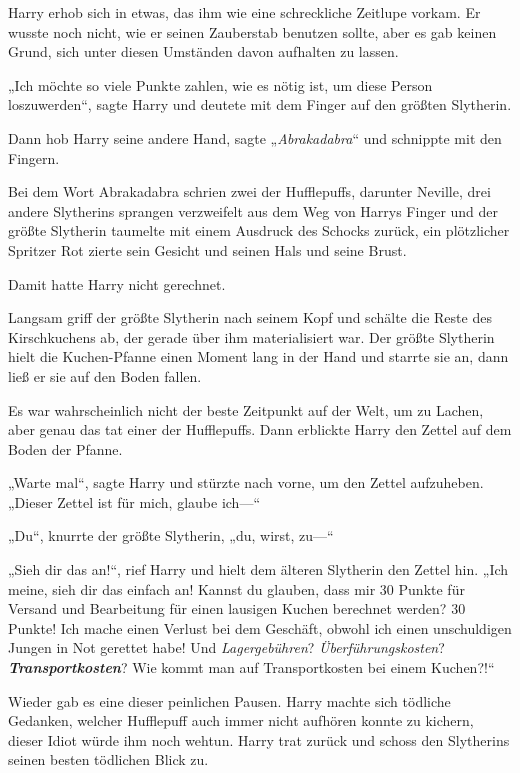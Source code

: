 {Harry erhob sich in etwas, das ihm wie eine schreckliche Zeitlupe vorkam. Er wusste noch nicht, wie er seinen Zauberstab benutzen sollte, aber es gab keinen Grund, sich unter diesen Umständen davon aufhalten zu lassen.

„Ich möchte so viele Punkte zahlen, wie es nötig ist, um diese Person loszuwerden“, sagte Harry und deutete mit dem Finger auf den größten Slytherin.

Dann hob Harry seine andere Hand, sagte „\emph{Abrakadabra}“ und schnippte mit den Fingern.

Bei dem Wort Abrakadabra schrien zwei der Hufflepuffs, darunter Neville, drei andere Slytherins sprangen verzweifelt aus dem Weg von Harrys Finger und der größte Slytherin taumelte mit einem Ausdruck des Schocks zurück, ein plötzlicher Spritzer Rot zierte sein Gesicht und seinen Hals und seine Brust.

Damit hatte Harry nicht gerechnet.

Langsam griff der größte Slytherin nach seinem Kopf und schälte die Reste des Kirschkuchens ab, der gerade über ihm materialisiert war. Der größte Slytherin hielt die Kuchen-Pfanne einen Moment lang in der Hand und starrte sie an, dann ließ er sie auf den Boden fallen.

Es war wahrscheinlich nicht der beste Zeitpunkt auf der Welt, um zu Lachen, aber genau das tat einer der Hufflepuffs. Dann erblickte Harry den Zettel auf dem Boden der Pfanne.

„Warte mal“, sagte Harry und stürzte nach vorne, um den Zettel aufzuheben. „Dieser Zettel ist für mich, glaube ich—“

„Du“, knurrte der größte Slytherin, „du, wirst, zu—“

„Sieh dir das an!“, rief Harry und hielt dem älteren Slytherin den Zettel hin. „Ich meine, sieh dir das einfach an! Kannst du glauben, dass mir 30 Punkte für Versand und Bearbeitung für einen lausigen Kuchen berechnet werden? 30 Punkte! Ich mache einen Verlust bei dem Geschäft, obwohl ich einen unschuldigen Jungen in Not gerettet habe! Und \emph{Lagergebühren}? \emph{Überführungskosten}? \textbf{\emph{Transportkosten}}? Wie kommt man auf Transportkosten bei einem Kuchen?!“

Wieder gab es eine dieser peinlichen Pausen. Harry machte sich tödliche Gedanken, welcher Hufflepuff auch immer nicht aufhören konnte zu kichern, dieser Idiot würde ihm noch wehtun. Harry trat zurück und schoss den Slytherins seinen besten tödlichen Blick zu.

}
